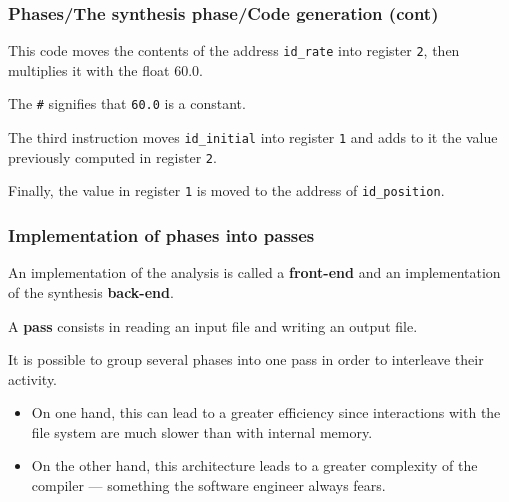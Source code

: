 %
\begin{frame}
\frametitle{Phases/The synthesis phase/Code generation (cont)}

This code moves the contents of the address \texttt{id\_rate} into
register \texttt{2}, then multiplies it with the float 60.0.

\bigskip

The \texttt{\#} signifies that \texttt{60.0} is a constant.

\bigskip

The third instruction moves \texttt{id\_initial} into register
\texttt{1} and adds to it the value previously computed in register
\texttt{2}.

\bigskip

Finally, the value in register \texttt{1} is moved to the address of
\texttt{id\_position}.

\end{frame}

%
\begin{frame}
\frametitle{Implementation of phases into passes}

An implementation of the analysis is called a \textbf{front-end} and
an implementation of the synthesis \textbf{back-end}.

\bigskip

A \textbf{pass} consists in reading an input file and writing an output
file.

\bigskip

It is possible to group several phases into one pass in order to
interleave their activity.
\begin{itemize}

  \item On one hand, this can lead to a greater efficiency since
  interactions with the file system are much slower than with internal
  memory.

  \item On the other hand, this architecture leads to a greater
  complexity of the compiler --- something the software engineer
  always fears.

\end{itemize}

\end{frame}

